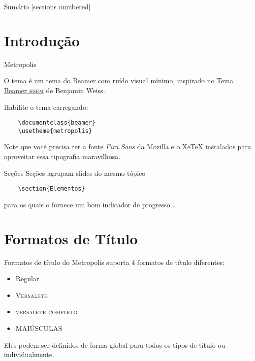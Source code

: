 \begin{frame}{Sumário}
  [sections numbered]
  \tableofcontents[hideallsubsections]
\end{frame}

\section{Introdução}

\begin{frame}[fragile]{Metropolis}

  O tema \themename é um tema do Beamer com ruído visual mínimo,
  inspirado no \href{https://github.com/hsrmbeamertheme/hsrmbeamertheme}{Tema Beamer \textsc{hsrm}} de Benjamin Weiss.

  Habilite o tema carregando:

  \begin{verbatim}    \documentclass{beamer}
    \usetheme{metropolis}\end{verbatim}

  Note que você precisa ter a fonte \emph{Fira Sans} da Mozilla e o XeTeX
  instalados para aproveitar essa tipografia maravilhosa.
\end{frame}

\begin{frame}[fragile]{Seções}
  Seções agrupam slides do mesmo tópico

  \begin{verbatim}    \section{Elementos}\end{verbatim}

  para os quais o \themename fornece um bom indicador de progresso \ldots
\end{frame}

\section{Formatos de Título}

\begin{frame}{Formatos de título do Metropolis}
	\themename suporta 4 formatos de título diferentes:
	\begin{itemize}
		\item Regular
		\item \textsc{Versalete}
		\item \textsc{versalete completo}
		\item MAIÚSCULAS
	\end{itemize}
	Eles podem ser definidos de forma global para todos os tipos de título ou individualmente.
\end{frame}

